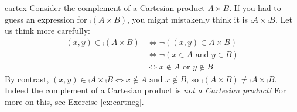 \begin{examples}{}{cartex}
	 	\exstart Consider the complement of a Cartesian product $A\times B$. If you had to guess an expression for $\comp{(A\times B)}$, you might mistakenly think it is $\comp A\times\comp B$. Let us think more carefully:
		\begin{align*}
			(x,y)\in\comp{(A\times B)}&\iff \neg((x,y)\in A\times B) \tag{definition of complement}\\
			&\iff \neg(x\in A\text{ and }y\in B) \tag{definition of $A\times B$}\\
			&\iff x\not\in A\text{ or }y\not\in B \tag{de Morgan (logic)}
		\end{align*}
		By contrast, $(x,y)\in\comp A\times\comp B\iff x\notin A\text{ and }x\notin B$, so $\comp{(A\times B)}\neq \comp A\times\comp B$. Indeed the complement of a Cartesian product is \emph{not a Cartesian product!} For more on this, see Exercise \ref{ex:cartneg}.


\end{examples}
